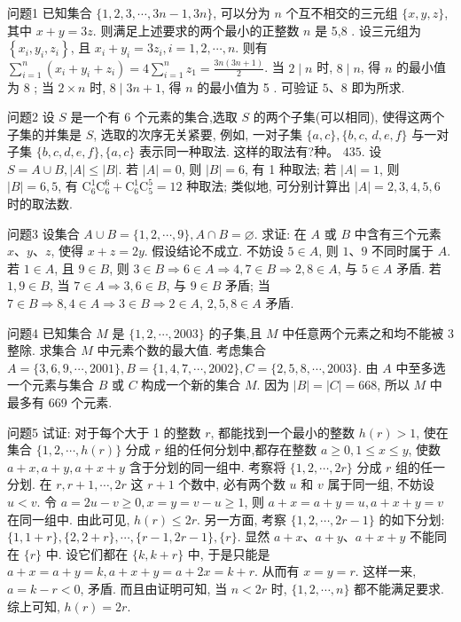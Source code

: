 
问题1 已知集合 $\{1,2,3, \cdots, 3 n-1,3 n\}$, 可以分为 $n$ 个互不相交的三元组 $\{x, y, z\}$, 其中 $x+y=3 z$. 则满足上述要求的两个最小的正整数 $n$ 是
5,8 . 设三元组为 $\left\{x_i, y_i, z_i\right\}$, 且 $x_i+y_i=3 z_i, i=1,2, \cdots, n$. 则有 $\sum_{i=1}^n\left(x_i+y_i+z_i\right)=4 \sum_{i=1}^n z_1=\frac{3 n(3 n+1)}{2}$. 当 $2 \mid n$ 时, $8 \mid n$, 得 $n$ 的最小值为 8 ; 当 $2 \times n$ 时, $8 \mid 3 n+1$, 得 $n$ 的最小值为 5 . 可验证 $5 、 8$ 即为所求.



问题2 设 $S$ 是一个有 6 个元素的集合,选取 $S$ 的两个子集(可以相同), 使得这两个子集的并集是 $S$, 选取的次序无关紧要, 例如, 一对子集 $\{a, c\},\{b, c$, $d, e, f\}$ 与一对子集 $\{b, c, d, e, f\},\{a, c\}$ 表示同一种取法.
这样的取法有?种。
$435$. 设 $S=A \cup B,|A| \leqslant|B|$. 若 $|A|=0$, 则 $|B|=6$, 有 1 种取法; 若 $|A|=1$, 则 $|B|=6,5$, 有 $\mathrm{C}_6^1 \mathrm{C}_6^6+\mathrm{C}_6^1 \mathrm{C}_5^5=12$ 种取法; 类似地, 可分别计算出 $|A|=2,3,4,5,6$ 时的取法数.



问题3 设集合 $A \cup B=\{1,2, \cdots, 9\}, A \cap B=\varnothing$. 求证: 在 $A$ 或 $B$ 中含有三个元素 $x 、 y 、 z$, 使得 $x+z=2 y$.
假设结论不成立.
不妨设 $5 \in A$, 则 $1 、 9$ 不同时属于 $A$. 若 $1 \in A$, 且 $9 \in B$, 则 $3 \in B \Rightarrow 6 \in A \Rightarrow 4,7 \in B \Rightarrow 2,8 \in A$, 与 $5 \in A$ 矛盾.
若 $1,9 \in B$, 当 $7 \in A \Rightarrow 3,6 \in B$, 与 $9 \in B$ 矛盾; 当 $7 \in B \Rightarrow 8,4 \in A \Rightarrow 3 \in B \Rightarrow 2 \in A$, $2,5,8 \in A$ 矛盾.



问题4 已知集合 $M$ 是 $\{1,2, \cdots, 2003\}$ 的子集,且 $M$ 中任意两个元素之和均不能被 3 整除.
求集合 $M$ 中元素个数的最大值.
考虑集合 $A=\{3,6,9, \cdots, 2001\}, B=\{1,4,7, \cdots, 2002\}, C= \{2,5,8, \cdots, 2003\}$. 由 $A$ 中至多选一个元素与集合 $B$ 或 $C$ 构成一个新的集合 $M$. 因为 $|B|=|C|=668$, 所以 $M$ 中最多有 669 个元素.



问题5 试证: 对于每个大于 1 的整数 $r$, 都能找到一个最小的整数 $h(r)>1$, 使在集合 $\{1,2, \cdots, h(r)\}$ 分成 $r$ 组的任何分划中,都存在整数 $a \geqslant 0,1 \leqslant x \leqslant y$, 使数 $a+x, a+y, a+x+y$ 含于分划的同一组中.
考察将 $\{1,2, \cdots, 2 r\}$ 分成 $r$ 组的任一分划.
在 $r, r+1, \cdots, 2 r$ 这 $r+1$ 个数中, 必有两个数 $u$ 和 $v$ 属于同一组, 不妨设 $u<v$. 令 $a=2 u-v \geqslant 0, x=y=v-u \geqslant 1$, 则 $a+x=a+y=u, a+x+y=v$ 在同一组中.
由此可见, $h(r) \leqslant 2 r$.
另一方面, 考察 $\{1,2, \cdots, 2 r-1\}$ 的如下分划: $\{1,1+r\},\{2,2+ r\}, \cdots,\{r-1,2 r-1\},\{r\}$. 显然 $a+x 、 a+y 、 a+x+y$ 不能同在 $\{r\}$ 中.
设它们都在 $\{k, k+r\}$ 中, 于是只能是 $a+x=a+y=k, a+x+y=a+ 2 x=k+r$. 从而有 $x=y=r$. 这样一来, $a=k-r<0$, 矛盾.
而且由证明可知, 当 $n<2 r$ 时, $\{1,2, \cdots, n\}$ 都不能满足要求.
综上可知, $h(r)=2 r$.



